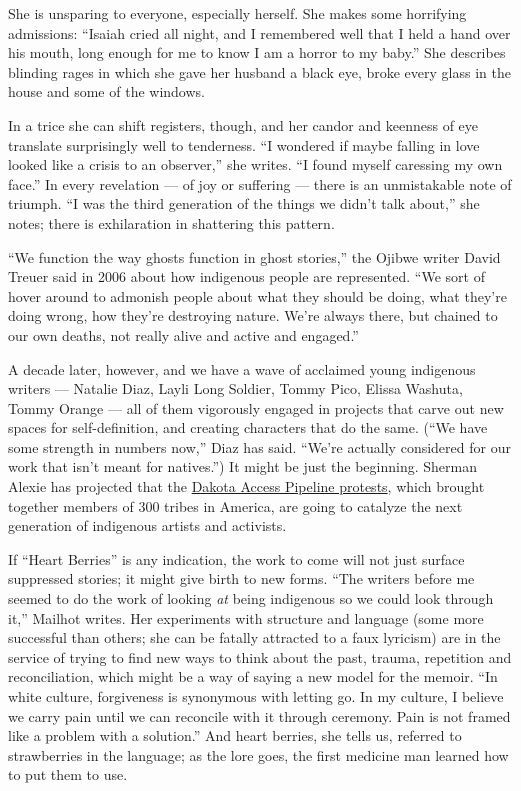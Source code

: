She is unsparing to everyone, especially herself. She makes some
horrifying admissions: ``Isaiah cried all night, and I remembered well
that I held a hand over his mouth, long enough for me to know I am a
horror to my baby.'' She describes blinding rages in which she gave her
husband a black eye, broke every glass in the house and some of the
windows.

In a trice she can shift registers, though, and her candor and keenness
of eye translate surprisingly well to tenderness. ``I wondered if maybe
falling in love looked like a crisis to an observer,'' she writes. ``I
found myself caressing my own face.'' In every revelation --- of joy or
suffering --- there is an unmistakable note of triumph. ``I was the
third generation of the things we didn't talk about,'' she notes; there
is exhilaration in shattering this pattern.

``We function the way ghosts function in ghost stories,'' the Ojibwe
writer David Treuer said in 2006 about how indigenous people are
represented. ``We sort of hover around to admonish people about what
they should be doing, what they're doing wrong, how they're destroying
nature. We're always there, but chained to our own deaths, not really
alive and active and engaged.''

A decade later, however, and we have a wave of acclaimed young
indigenous writers --- Natalie Diaz, Layli Long Soldier, Tommy Pico,
Elissa Washuta, Tommy Orange --- all of them vigorously engaged in
projects that carve out new spaces for self-definition, and creating
characters that do the same. (``We have some strength in numbers now,''
Diaz has said. ``We're actually considered for our work that isn't meant
for natives.'') It might be just the beginning. Sherman Alexie has
projected that the
\href{https://www.nytimes3xbfgragh.onion/2016/11/02/us/north-dakota-oil-pipeline-battle-whos-fighting-and-why.html}{Dakota
Access Pipeline protests}, which brought together members of 300 tribes
in America, are going to catalyze the next generation of indigenous
artists and activists.

If ``Heart Berries'' is any indication, the work to come will not just
surface suppressed stories; it might give birth to new forms. ``The
writers before me seemed to do the work of looking \emph{at} being
indigenous so we could look through it,'' Mailhot writes. Her
experiments with structure and language (some more successful than
others; she can be fatally attracted to a faux lyricism) are in the
service of trying to find new ways to think about the past, trauma,
repetition and reconciliation, which might be a way of saying a new
model for the memoir. ``In white culture, forgiveness is synonymous with
letting go. In my culture, I believe we carry pain until we can
reconcile with it through ceremony. Pain is not framed like a problem
with a solution.'' And heart berries, she tells us, referred to
strawberries in the language; as the lore goes, the first medicine man
learned how to put them to use.

